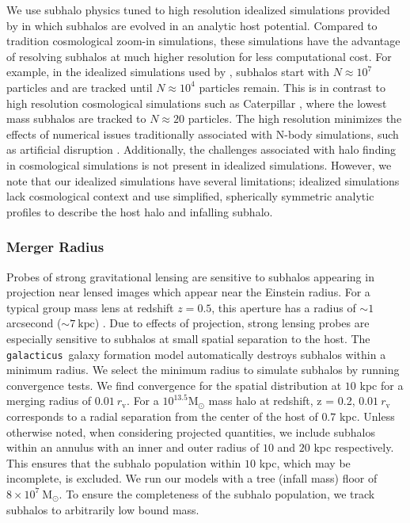 \documentclass[%
 reprint,
 amsmath,
 amssymb,
 aps,
prd,
twocolumn,
superscriptaddress,
preprintnumbers,
floatfix,
nofootinbib
]{revtex4-2}
\def\gal{{\tt galacticus}~}
\def\cat{Caterpillar }
\begin{document}
We use subhalo physics tuned to high resolution idealized simulations provided by \citet{2024arXiv240309597D} in which subhalos are evolved in an analytic host potential.
Compared to tradition cosmological zoom-in simulations, these simulations have the advantage of resolving subhalos at much higher resolution for less computational cost.
For example, in the idealized simulations used by \citet{2024arXiv240309597D}, subhalos start with $N \approx 10^7$ particles and are tracked until $N \approx 10^4$ particles remain.
This is in contrast to high resolution cosmological simulations such as \cat \citep{griffen2016caterpillar}, where the lowest mass subhalos are tracked to $N \approx 20$ particles.
The high resolution minimizes the effects of numerical issues traditionally associated with N-body simulations, such as artificial disruption \citep{10.1093/mnras/sty084}.
Additionally, the challenges associated with halo finding in cosmological simulations is not present in idealized simulations.
However, we note that our idealized simulations have several limitations; idealized simulations lack cosmological context and use simplified, spherically symmetric analytic profiles to describe the host halo and infalling subhalo.

\subsubsection{Merger Radius}\label{sec_methods_galacticus_merger}
Probes of strong gravitational lensing are sensitive to subhalos appearing in projection near lensed images which appear near the Einstein radius.
For a typical group mass lens at redshift $z=0.5$, this aperture has a radius of $\sim 1$ arcsecond ($\sim 7 ~\text{kpc}$) \citep[][]{shu2017sloan}.
Due to effects of projection, strong lensing probes are especially sensitive to subhalos at small spatial separation to the host.
The \gal galaxy formation model automatically destroys subhalos within a minimum radius.
We select the minimum radius to simulate subhalos by running convergence tests.
We find convergence for the spatial distribution at $10$ kpc for a merging radius of $0.01~r_{\mathrm{v}}$.
For a $10^{13.5} \mathrm{M}_{\odot}$ mass halo at redshift, z = 0.2, $0.01~r_{\mathrm{v}}$ corresponds to a radial separation from the center of the host of $0.7$ kpc.
Unless otherwise noted, when considering projected quantities, we include subhalos within an annulus with an inner and outer radius of $10$ and $20$ kpc respectively.
This ensures that the subhalo population within $10$ kpc, which may be incomplete, is excluded.
We run our models with a tree (infall mass) floor of $8 \times 10^7 \
\mathrm{M}_\odot$.
To ensure the completeness of the subhalo population, we track subhalos to arbitrarily low bound mass.
\end{document}

